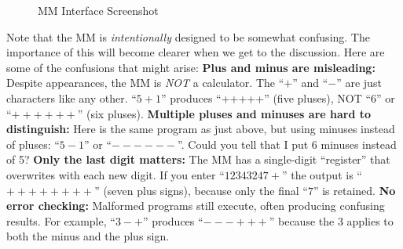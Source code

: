 \documentclass[12pt,letterpaper]{article}
\begin{document}
\begin{figure}[!htb]
    \centering
        \caption{MM Interface Screenshot}
    \label{fig1}
\end{figure}

Note that the MM is \textit{intentionally} designed to be somewhat confusing. The importance of this will become clearer when we get to the discussion. Here are some of the confusions that might arise: \textbf{Plus and minus are misleading:} Despite appearances, the MM is \textit{NOT} a calculator. The ``$+$'' and ``$-$'' are just characters like any other. ``$5+1$'' produces ``+++++'' (five pluses), NOT ``$6$'' or ``$++++++$'' (six pluses). \textbf{Multiple pluses and minuses are hard to distinguish:} Here is the same program as just above, but using minuses instead of pluses: ``$5-1$'' or ``$------$''. Could you tell that I put 6 minuses instead of 5? \textbf{Only the last digit matters:} The MM has a single-digit ``register'' that overwrites with each new digit. If you enter ``$12343247+$'' the output is ``$++++++++$'' (seven plus signs), because only the final ``$7$'' is retained. \textbf{No error checking:} Malformed programs still execute, often producing confusing results. For example, ``$3-+$'' produces ``$- - - +++$'' because the $3$ applies to both the minus and the plus sign. 
\end{document}
